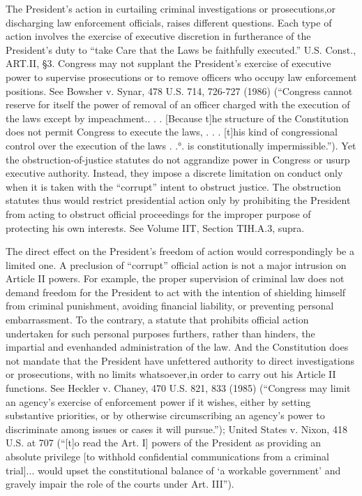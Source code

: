 The President’s action in curtailing criminal investigations or prosecutions,or discharging
law enforcement officials, raises different questions. Each type of action involves the exercise of
executive discretion in furtherance of the President’s duty to “take Care that the Laws be faithfully
executed.” U.S. Const., ART.II, \S 3. Congress may not supplant the President’s exercise of
executive power to supervise prosecutions or to remove officers who occupy law enforcement
positions. See Bowsher v. Synar, 478 U.S. 714, 726-727 (1986) (“Congress cannot reserve for
itself the power of removal of an officer charged with the execution of the laws except by
impeachment.. . . [Because t]he structure of the Constitution does not permit Congress to execute
the laws, . . . [t]his kind of congressional control over the execution of the laws . .°. is
constitutionally impermissible.”). Yet the obstruction-of-justice statutes do not aggrandize power
in Congress or usurp executive authority. Instead, they impose a discrete limitation on conduct
only when it is taken with the “corrupt” intent to obstruct justice. The obstruction statutes thus
would restrict presidential action only by prohibiting the President from acting to obstruct official
proceedings for the improper purpose of protecting his own interests. See Volume IIT, Section
TIH.A.3, supra.

The direct effect on the President’s freedom of action would correspondingly be a limited
one. A preclusion of “corrupt” official action is not a major intrusion on Article II powers. For
example, the proper supervision of criminal law does not demand freedom for the President to act
with the intention of shielding himself from criminal punishment, avoiding financial liability, or
preventing personal embarrassment. To the contrary, a statute that prohibits official action
undertaken for such personal purposes furthers, rather than hinders, the impartial and evenhanded
administration of the law. And the Constitution does not mandate that the President have
unfettered authority to direct investigations or prosecutions, with no limits whatsoever,in order to
carry out his Article II functions. See Heckler v. Chaney, 470 U.S. 821, 833 (1985) (“Congress
may limit an agency’s exercise of enforcement power if it wishes, either by setting substantive
priorities, or by otherwise circumscribing an agency’s power to discriminate among issues or cases
it will pursue.”); United States v. Nixon, 418 U.S. at 707 (“[t]o read the Art. I] powers of the
President as providing an absolute privilege [to withhold confidential communications from a
criminal trial]... would upset the constitutional balance of ‘a workable government’ and gravely
impair the role of the courts under Art. III”).

